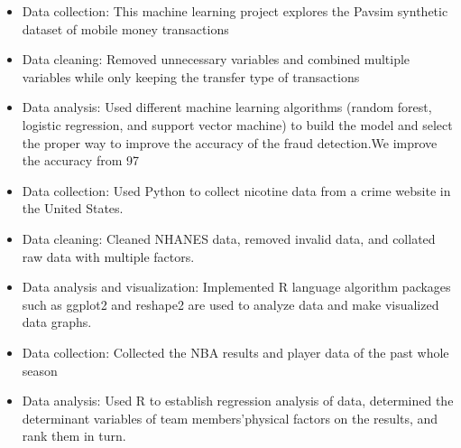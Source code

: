 
\divider

\divider



\begin{itemize}
\item Data collection: This machine learning project explores the Pavsim synthetic dataset of mobile money transactions
\item Data cleaning: Removed unnecessary variables and combined multiple variables while only keeping the transfer type of transactions
\item Data analysis: Used different machine learning algorithms (random forest, logistic regression, and support vector machine) to build the model and select the proper way to improve the accuracy of the fraud detection.We improve the accuracy from 97%
\end{itemize}
\smallskip
{}
\begin{itemize}
\item Data collection: Used Python to collect nicotine data from a crime website in the United States.
\item Data cleaning: Cleaned NHANES data, removed invalid data, and collated raw data with multiple factors.
\item Data analysis and visualization: Implemented R language algorithm packages such as ggplot2 and reshape2 are used to analyze data and make visualized data graphs.
\end{itemize}
\smallskip

\begin{itemize}
\item Data collection: Collected the NBA results and player data of the past whole season
\item Data analysis: Used R to establish regression analysis of data, determined the determinant variables of team members'physical factors on the results, and rank them in turn.
\end{itemize}